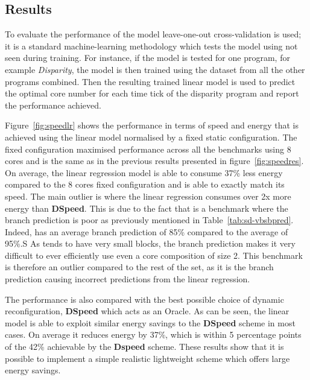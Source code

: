 \subsection{Results}

To evaluate the performance of the model leave-one-out cross-validation  is used; it is a standard machine-learning methodology which tests the model using not seen during training.
For instance, if the model is tested for one program, for example \textit{Disparity}, the model is then trained using the dataset from all the other programs combined.
Then the resulting trained linear model is used to predict the optimal core number for each time tick of the disparity program and report the performance achieved.

Figure~\ref{fig:speedlr} shows the performance in terms of speed and energy that is achieved using the linear model normalised by a fixed static configuration.
The fixed configuration maximised performance across all the benchmarks using 8 cores and is the same as in the previous results presented in figure~\ref{fig:speedres}.
On average, the linear regression model is able to consume 37\% less energy compared to the 8 cores fixed configuration and is able to exactly match its speed.
The main outlier is  where the linear regression consumes over 2x more energy than \textbf{DSpeed}.
This is due to the fact that  is a benchmark where the branch prediction is poor as previously mentioned in Table~\ref{tab:sd-vbsbpred}.
Indeed,  has an average branch prediction of 85\% compared to the average of 95\%.S
As  tends to have very small blocks, the branch prediction makes it very difficult to ever efficiently use even a core composition of size 2.
This benchmark is therefore an outlier compared to the rest of the set, as it is the branch prediction causing incorrect predictions from the linear regression.

The performance is also compared with the best possible choice of dynamic reconfiguration, \textbf{DSpeed} which acts as an Oracle.
As can be seen, the linear model is able to exploit similar energy savings to the \textbf{DSpeed} scheme in most cases.
On average it reduces energy by 37\%, which is within 5 percentage points of the 42\% achievable by the \textbf{Dspeed} scheme.
These results show that it is possible to implement a simple realistic lightweight scheme which offers large energy savings.

